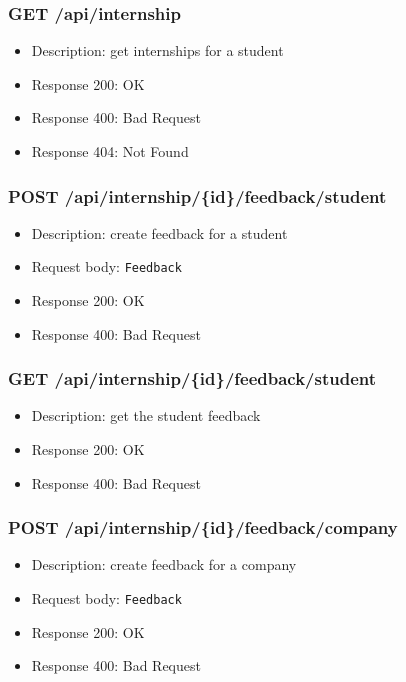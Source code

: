 \subsubsection{GET /api/internship}
\begin{itemize}
    \item Description: get internships for a student
    \item Response 200: OK
    \item Response 400: Bad Request
    \item Response 404: Not Found
\end{itemize}

\subsubsection{POST /api/internship/\{id\}/feedback/student}
\begin{itemize}
    \item Description: create feedback for a student
    \item Request body: \verb|Feedback|
    \item Response 200: OK
    \item Response 400: Bad Request
\end{itemize}

\subsubsection{GET /api/internship/\{id\}/feedback/student}
\begin{itemize}
    \item Description: get the student feedback
    \item Response 200: OK
    \item Response 400: Bad Request
\end{itemize}

\subsubsection{POST /api/internship/\{id\}/feedback/company}
\begin{itemize}
    \item Description: create feedback for a company
    \item Request body: \verb|Feedback|
    \item Response 200: OK
    \item Response 400: Bad Request
\end{itemize}

